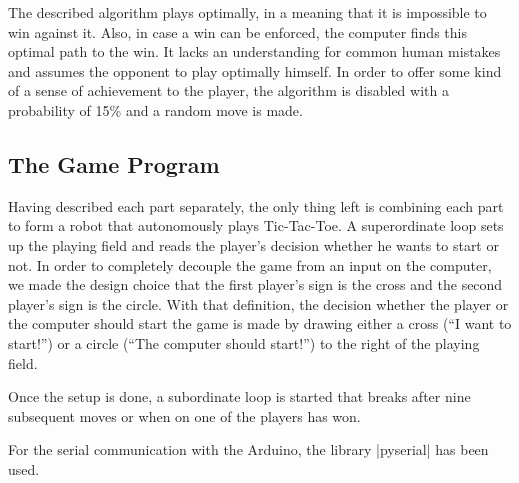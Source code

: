 \documentclass{sig-alternate-05-2015}
\begin{document}
The described algorithm plays optimally, in a meaning that it is impossible to win against it. Also, in case a win can be enforced, the computer finds this optimal path to the win. It lacks an understanding for common human mistakes and assumes the opponent to play optimally himself. In order to offer some kind of a sense of achievement to the player, the algorithm is disabled with a probability of 15\% and a random move is made.

\subsection{The Game Program}
Having described each part separately, the only thing left is combining each part to form a robot that autonomously plays Tic-Tac-Toe. A superordinate loop sets up the playing field and reads the player's decision whether he wants to start or not. In order to completely decouple the game from an input on the computer, we made the design choice that the first player's sign is the cross and the second player's sign is the circle. With that definition, the decision whether the player or the computer should start the game is made by drawing either a cross (``I want to start!'') or a circle (``The computer should start!'') to the right of the playing field.

Once the setup is done, a subordinate loop is started that breaks after nine subsequent moves or when on one of the players has won.

For the serial communication with the Arduino, the library |pyserial| \cite{PyS} has been used.


%
\end{document}
